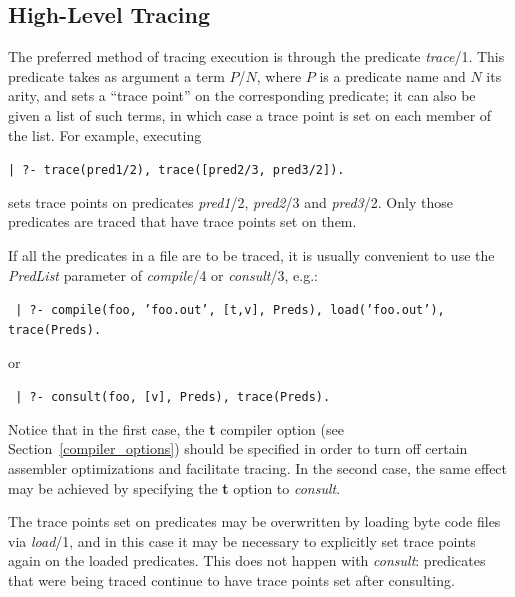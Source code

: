 \subsection{High-Level Tracing}

The preferred method of tracing execution is through the predicate
{\em trace}/1.
This predicate takes as argument a term $P$/$N$,
where $P$ is a predicate name and $N$ its arity, and sets a ``trace point''
on the corresponding predicate; it can also be given a list of such terms,
in which case a trace point is set on each member of the list.
For example, executing
\begin{center}
{\tt | ?- trace(pred1/2), trace([pred2/3, pred3/2]).}
\end{center}
sets trace points on predicates {\em pred1}/2, {\em pred2}/3 and {\em pred3}/2.
Only those predicates are traced that have trace points set on them.

If all the predicates in a file are to be traced,
it is usually convenient to use the {\em PredList} parameter of {\em compile}/4
or {\em consult}/3, e.g.:
\begin{center}
{\tt 
| ?- compile(foo, 'foo.out', [t,v], Preds), load('foo.out'), trace(Preds).}
\end{center}
or
\begin{center}
{\tt 
| ?- consult(foo, [v], Preds), trace(Preds).}
\end{center}
Notice that in the first case, the {\bf t} compiler option (see Section~\ref{compiler_options})
should be specified in order to turn off certain assembler optimizations
and facilitate tracing.
In the second case, the same effect may be achieved by specifying the {\bf t}
option to {\em consult}.

The trace points set on predicates may be overwritten by loading byte code
files via {\em load}/1, and in this case it may be necessary to explicitly
set trace points again on the loaded predicates.
This does not happen with {\em consult}:
predicates that were being traced continue to have trace points set
after consulting.

